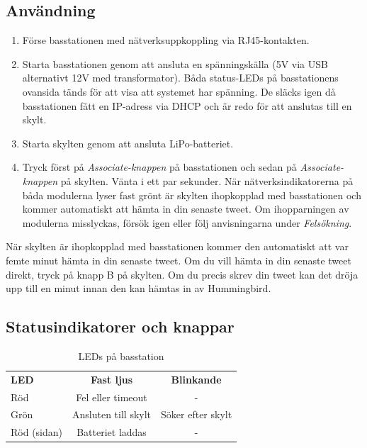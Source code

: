\documentclass[a4paper,11pt]{article}
\begin{document}
\subsection{Användning}

\begin{enumerate}
    \item Förse basstationen med nätverksuppkoppling via RJ45-kontakten.
    \item Starta basstationen genom att ansluta en spänningskälla (5V via USB alternativt 12V med transformator). Båda status-LEDs på basstationens ovansida tänds för att visa att systemet har spänning. De släcks igen då basstationen fått en IP-adress via DHCP och är redo för att anslutas till en skylt.
    \item Starta skylten genom att ansluta LiPo-batteriet.
    \item Tryck först på {\it Associate-knappen} på basstationen och sedan på {\it Associate-knappen} på skylten. Vänta i ett par sekunder. När nätverksindikatorerna på båda modulerna lyser fast grönt är skylten ihopkopplad med basstationen och kommer automatiskt att hämta in din senaste tweet. Om ihopparningen av modulerna misslyckas, försök igen eller följ anvisningarna under {\it Felsökning}.
\end{enumerate}

När skylten är ihopkopplad med basstationen kommer den automatiskt att var femte minut hämta in din senaste tweet. Om du vill hämta in din senaste tweet direkt, tryck på knapp B på skylten. Om du precis skrev din tweet kan det dröja upp till en minut innan den kan hämtas in av Hummingbird.
		
\subsection{Statusindikatorer och knappar}

\begin{table}[h!]
\centering
    \begin{tabular}{|l|c|c|}
    {\bf LED} & {\bf Fast ljus} & {\bf Blinkande}\\
    Röd & Fel eller timeout & - \\
    Grön & Ansluten till skylt & Söker efter skylt \\
    Röd (sidan) & Batteriet laddas & - \\
    \end{tabular}
\caption{LEDs på basstation}
\label{tab:ledtable_base}
\end{table}
\end{document}
